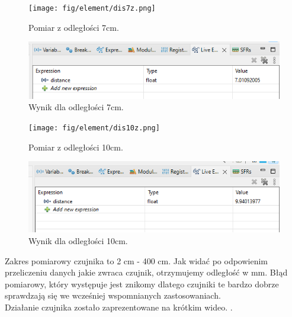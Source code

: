 \documentclass[11pt, a4paper]{article}
\begin{document}
\newpage

\vspace{0.5cm}
\begin{figure}[h!]
    \centering
    \texttt{[image: fig/element/dis7z.png]}
    \caption{Pomiar z odległości 7cm.}
    \label{fig:my_label}
\end{figure}

\vspace{0.5cm}
\begin{figure}[h!]
    \centering
    \includegraphics[width=\textwidth]{fig/element/dis7.png}
    \caption{Wynik dla odległości 7cm.}
    \label{fig:my_label}
\end{figure}

\newpage

\vspace{0.5cm}
\begin{figure}[h!]
    \centering
    \texttt{[image: fig/element/dis10z.png]}
    \caption{Pomiar z odległości 10cm.}
    \label{fig:my_label}
\end{figure}

\vspace{0.5cm}
\begin{figure}[h!]
    \centering
    \includegraphics[width=.9\textwidth]{fig/element/dis10.png}
    \caption{Wynik dla odległości 10cm.}
    \label{fig:my_label}
\end{figure}

\vspace{1cm}

Zakres pomiarowy czujnika to 2 cm - 400 cm. Jak widać po odpowienim przeliczeniu danych jakie zwraca czujnik, otrzymujemy odległość w mm. Błąd pomiarowy, który występuje jest znikomy dlatego czujniki te bardzo dobrze sprawdzają się we wcześniej wspomnianych zastosowaniach.\\


Działanie czujnika zostało zaprezentowane na krótkim wideo. \cite{youtube}.
\clearpage
\newpage
\printbibliography[heading=bibintoc]
\end{document}
